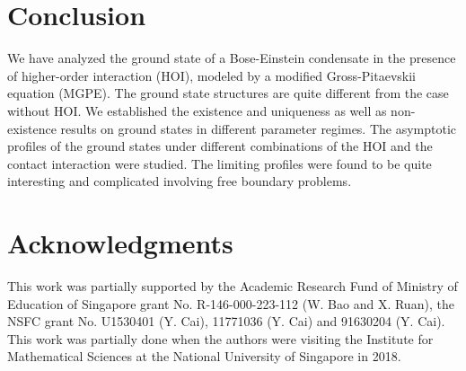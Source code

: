 \documentclass{elsarticle}
\newcommand{\be}{\begin{equation}}
\newcommand{\ee}{\end{equation}}
\newcommand{\bx}{{\bf x} }
\begin{document}
%
%
%


\section{Conclusion}
We  have analyzed the ground state of a Bose-Einstein condensate in the presence of higher-order interaction (HOI),
modeled by a modified Gross-Pitaevskii equation (MGPE).
The ground state structures are quite different from the case without HOI.
We established the existence and  uniqueness as well as non-existence
results on ground states in different parameter regimes. The asymptotic profiles of the ground states
under different combinations of the HOI and the contact interaction were studied. The limiting profiles were found to
be quite interesting and complicated involving free boundary problems. %


\section*{Acknowledgments}
This work was partially supported by the Academic Research
Fund of Ministry of Education of Singapore grant No.
R-146-000-223-112 (W. Bao and X. Ruan), the NSFC grant No. U1530401 (Y. Cai), 11771036 (Y. Cai)  and  91630204 (Y. Cai). This work was partially done
when the authors were visiting the Institute for Mathematical Sciences
at the National University of Singapore in 2018.




\section*{\refname}
\end{document}
